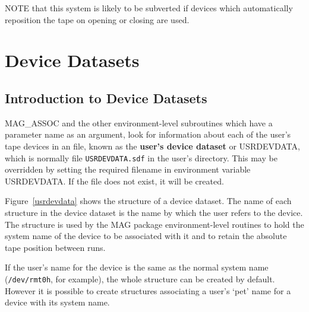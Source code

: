 NOTE that this system is likely to be subverted if devices which automatically 
reposition the tape on opening or closing are used.

\section{\label{device_datasets}Device Datasets}
\subsection{\label{dataset_intro}Introduction to Device Datasets}
MAG\_ASSOC and the other environment-level subroutines which have a
parameter name as an argument, look for information about each of the user's 
tape devices in an 
 file, known as the {\bf user's device dataset} or USRDEVDATA, 
which is normally file {\tt USRDEVDATA.sdf} in the user's 
directory. 
This may be overridden by setting the required filename in environment 
variable USRDEVDATA. If the file does not exist, it will be created.

Figure~\ref{usrdevdata} shows the structure of a device dataset.
The name of each structure in the device dataset is the name by which the user
refers to the device. 
The structure is used by the MAG package environment-level routines to hold the
system name of the device to be associated with it and to retain the absolute
tape position between runs.

If the user's name for the device is the same as the normal system name 
({\tt /dev/rmt0h}, for example), the whole structure can be created by default.
However it is possible to create structures associating a user's `pet' name
for a device with its system name.

